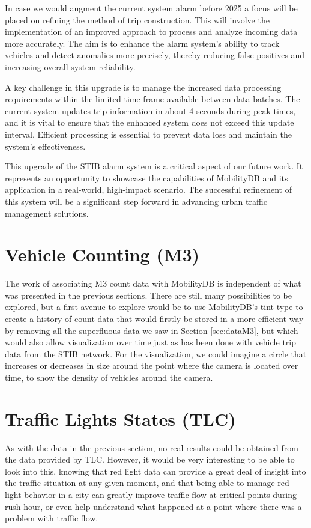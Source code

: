 \documentclass[12pt]{report}
\begin{document}
	In case we would augment the current system alarm before 2025 a focus will be placed on refining the method of trip construction. This will involve the implementation of an improved approach to process and analyze incoming data more accurately. The aim is to enhance the alarm system's ability to track vehicles and detect anomalies more precisely, thereby reducing false positives and increasing overall system reliability.
	
	A key challenge in this upgrade is to manage the increased data processing requirements within the limited time frame available between data batches. The current system updates trip information in about 4 seconds during peak times, and it is vital to ensure that the enhanced system does not exceed this update interval. Efficient processing is essential to prevent data loss and maintain the system's effectiveness.
	
	This upgrade of the STIB alarm system is a critical aspect of our future work. It represents an opportunity to showcase the capabilities of MobilityDB and its application in a real-world, high-impact scenario. The successful refinement of this system will be a significant step forward in advancing urban traffic management solutions.
	
	
	\section{Vehicle Counting (M3)}
	\label{sec:futurWorkM3}
	
	The work of associating M3 count data with MobilityDB is independent of what was presented in the previous sections. There are still many possibilities to be explored, but a first avenue to explore would be to use MobilityDB's tint type to create a history of count data that would firstly be stored in a more efficient way by removing all the superfluous data we saw in Section \ref{sec:dataM3}, but which would also allow visualization over time just as has been done with vehicle trip data from the STIB network. For the visualization, we could imagine a circle that increases or decreases in size around the point where the camera is located over time, to show the density of vehicles around the camera.
	
	\section{Traffic Lights States (TLC)}
	\label{sec:futurWorkTLC}
	
	As with the data in the previous section, no real results could be obtained from the data provided by TLC. However, it would be very interesting to be able to look into this, knowing that red light data can provide a great deal of insight into the traffic situation at any given moment, and that being able to manage red light behavior in a city can greatly improve traffic flow at critical points during rush hour, or even help understand what happened at a point where there was a problem with traffic flow. 
	
\end{document}
